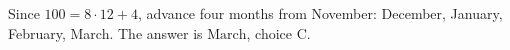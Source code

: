 Since $100=8\cdot 12+4$, advance four months from November: December, January, February, March. The answer is $\boxed{\text{March}}$, choice C.
